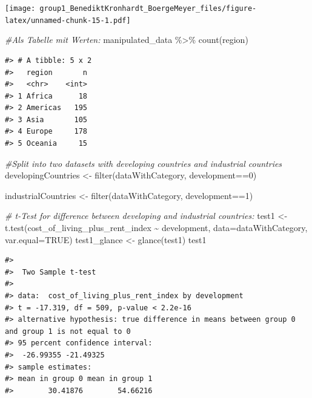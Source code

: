 \documentclass[
  11pt,
  a4paper,
  twoside]{scrbook}
\newenvironment{Shaded}{\begin{snugshade}}{\end{snugshade}}
\newcommand{\AttributeTok}[1]{\textcolor[rgb]{0.77,0.63,0.00}{#1}}
\newcommand{\CommentTok}[1]{\textcolor[rgb]{0.56,0.35,0.01}{\textit{#1}}}
\newcommand{\ConstantTok}[1]{\textcolor[rgb]{0.00,0.00,0.00}{#1}}
\newcommand{\DecValTok}[1]{\textcolor[rgb]{0.00,0.00,0.81}{#1}}
\newcommand{\FunctionTok}[1]{\textcolor[rgb]{0.00,0.00,0.00}{#1}}
\newcommand{\NormalTok}[1]{#1}
\newcommand{\OtherTok}[1]{\textcolor[rgb]{0.56,0.35,0.01}{#1}}
\newcommand{\SpecialCharTok}[1]{\textcolor[rgb]{0.00,0.00,0.00}{#1}}
\begin{document}
\linespread{1}\texttt{[image: group1\_BenediktKronhardt\_BoergeMeyer\_files/figure-latex/unnamed-chunk-15-1.pdf]} \linespread{1}

\begin{Shaded}
\begin{Highlighting}[]

\CommentTok{\#Als Tabelle mit Werten:}
\NormalTok{manipulated\_data }\SpecialCharTok{\%\textgreater{}\%} \FunctionTok{count}\NormalTok{(region)}
\end{Highlighting}
\end{Shaded}

\linespread{1}

\begin{verbatim}
#> # A tibble: 5 x 2
#>   region       n
#>   <chr>    <int>
#> 1 Africa      18
#> 2 Americas   195
#> 3 Asia       105
#> 4 Europe     178
#> 5 Oceania     15
\end{verbatim}

\linespread{1}

\begin{Shaded}
\begin{Highlighting}[]


\CommentTok{\#Split into two datasets with developing countries and industrial countries}
\NormalTok{developingCountries }\OtherTok{\textless{}{-}} \FunctionTok{filter}\NormalTok{(dataWithCategory, development}\SpecialCharTok{==}\DecValTok{0}\NormalTok{)}

\NormalTok{industrialCountries }\OtherTok{\textless{}{-}} \FunctionTok{filter}\NormalTok{(dataWithCategory, development}\SpecialCharTok{==}\DecValTok{1}\NormalTok{)}


\CommentTok{\# t{-}Test for difference between developing and industrial countries:}
\NormalTok{test1 }\OtherTok{\textless{}{-}} \FunctionTok{t.test}\NormalTok{(cost\_of\_living\_plus\_rent\_index }\SpecialCharTok{\textasciitilde{}}\NormalTok{ development, }\AttributeTok{data=}\NormalTok{dataWithCategory, }\AttributeTok{var.equal=}\ConstantTok{TRUE}\NormalTok{)}
\NormalTok{test1\_glance }\OtherTok{\textless{}{-}} \FunctionTok{glance}\NormalTok{(test1)}
\NormalTok{test1}
\end{Highlighting}
\end{Shaded}

\linespread{1}

\begin{verbatim}
#> 
#>  Two Sample t-test
#> 
#> data:  cost_of_living_plus_rent_index by development
#> t = -17.319, df = 509, p-value < 2.2e-16
#> alternative hypothesis: true difference in means between group 0 and group 1 is not equal to 0
#> 95 percent confidence interval:
#>  -26.99355 -21.49325
#> sample estimates:
#> mean in group 0 mean in group 1 
#>        30.41876        54.66216
\end{verbatim}
\end{document}
